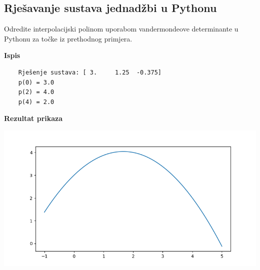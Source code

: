 \pagebreak

\subsection{Rješavanje sustava jednadžbi u Pythonu}

\begin{example}
    Odredite interpolacijski polinom uporabom vandermondeove determinante u
    Pythonu za točke iz prethodnog primjera.
\end{example}

\begin{multicols}{2}
    

    \columnbreak

    \textbf{Ispis}

    \begin{verbatim}
    Rješenje sustava: [ 3.     1.25  -0.375]
    p(0) = 3.0
    p(2) = 4.0
    p(4) = 2.0
    \end{verbatim}

    \textbf{Rezultat prikaza}

    \includegraphics[width=\linewidth]{fig/vandermond.png}

\end{multicols}
